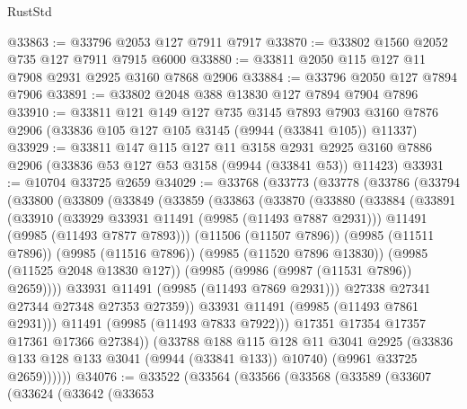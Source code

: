 \begin{lexlean}{RustStd}
\begin{coremodule}
@33863 := @33796 @2053 @127 @7911 @7917
@33870 := @33802 @1560 @2052 @735 @127 @7911 @7915 @6000
@33880 := @33811 @2050 @115 @127 @11 @7908 @2931 @2925 @3160 @7868 @2906
@33884 := @33796 @2050 @127 @7894 @7906
@33891 := @33802 @2048 @388 @13830 @127 @7894 @7904 @7896
@33910 := @33811
    @121
    @149
    @127
    @735
    @3145
    @7893
    @7903
    @3160
    @7876
    @2906
    (@33836 @105 @127 @105 @3145 (@9944 (@33841 @105)) @11337)
@33929 := @33811
    @147
    @115
    @127
    @11
    @3158
    @2931
    @2925
    @3160
    @7886
    @2906
    (@33836 @53 @127 @53 @3158 (@9944 (@33841 @53)) @11423)
@33931 := @10704 @33725 @2659
@34029 := @33768
    (@33773
      (@33778
        (@33786
          (@33794
            (@33800
              (@33809
                (@33849
                  (@33859
                    (@33863
                      (@33870
                        (@33880
                          (@33884
                            (@33891
                              (@33910
                                (@33929 @33931 @11491 (@9985 (@11493 @7887 @2931)))
                                @11491
                                (@9985 (@11493 @7877 @7893)))
                              (@11506 (@11507 @7896))
                              (@9985 (@11511 @7896))
                              (@9985 (@11516 @7896))
                              (@9985 (@11520 @7896 @13830))
                              (@9985 (@11525 @2048 @13830 @127))
                              (@9985 (@9986 (@9987 (@11531 @7896)) @2659))))
                          @33931
                          @11491
                          (@9985 (@11493 @7869 @2931)))
                        @27338
                        @27341
                        @27344
                        @27348
                        @27353
                        @27359))
                    @33931
                    @11491
                    (@9985 (@11493 @7861 @2931)))
                  @11491
                  (@9985 (@11493 @7833 @7922)))
                @17351
                @17354
                @17357
                @17361
                @17366
                @27384))
            (@33788
              @188
              @115
              @128
              @11
              @3041
              @2925
              (@33836 @133 @128 @133 @3041 (@9944 (@33841 @133)) @10740)
              (@9961 @33725 @2659))))))
@34076 := @33522
    (@33564
      (@33566
        (@33568
          (@33589
            (@33607
              (@33624
                (@33642
                  (@33653

\end{coremodule}
\end{lexlean}
